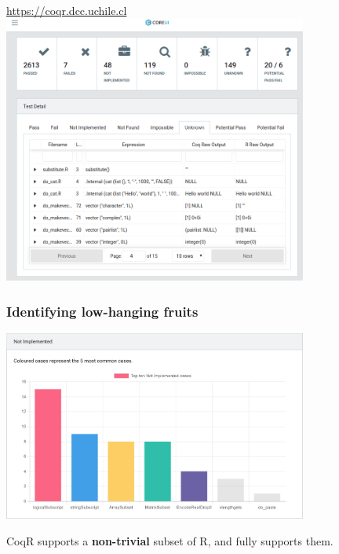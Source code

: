 \documentclass{beamer}
\newcommand\emphb{\textbf}
\begin{document}
\begin{frame}
    \begin{center}
        \vspace{-2mm}
        \href{https://coqr.dcc.uchile.cl/\#/test-detail/148}{\url{https://coqr.dcc.uchile.cl}}
        \vspace{2mm}
        \includegraphics[width=10cm]{images/unknown.png}
    \end{center}
\end{frame}




\begin{frame}
    \frametitle{Identifying low-hanging fruits}

    \begin{center}
        \includegraphics[width=10cm]{images/not-implemented.png}
    \end{center}

    \pause
    CoqR supports a \emphb{non-trivial} subset of R, and fully supports them.

\end{frame}
\end{document}
